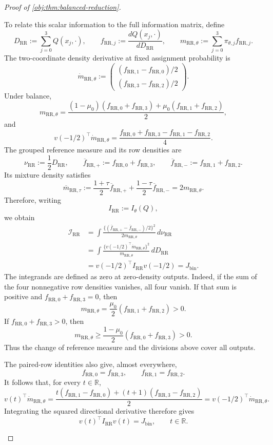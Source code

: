 \documentclass[11pt]{article}
\begin{document}
\begin{proof}[Proof of \cref{obj:thm:balanced-reduction}]
\begin{enumerate}
To relate this scalar information to the full information matrix, define
\[
D_{\mathrm{RR}}
:=\sum_{j=0}^3Q(x_j,\cdot),
\qquad
f_{\mathrm{RR},j}
:=\frac{dQ(x_j,\cdot)}{dD_{\mathrm{RR}}},
\qquad
m_{\mathrm{RR},\theta}
:=\sum_{j=0}^3\pi_{\theta,j}f_{\mathrm{RR},j}.
\]
The two-coordinate density derivative at fixed assignment probability is
\[
\dot m_{\mathrm{RR},\theta}
:=
\begin{pmatrix}
(f_{\mathrm{RR},1}-f_{\mathrm{RR},0})/2\\
(f_{\mathrm{RR},3}-f_{\mathrm{RR},2})/2
\end{pmatrix}.
\]
Under balance,
\[
m_{\mathrm{RR},\theta}
=
\frac{(1-\mu_0)(f_{\mathrm{RR},0}+f_{\mathrm{RR},3})
+\mu_0(f_{\mathrm{RR},1}+f_{\mathrm{RR},2})}{2},
\]
and
\[
v(-1/2)^\top\dot m_{\mathrm{RR},\theta}
=
\frac{f_{\mathrm{RR},0}+f_{\mathrm{RR},3}
-f_{\mathrm{RR},1}-f_{\mathrm{RR},2}}4.
\]
The grouped reference measure and its row densities are
\[
\nu_{\mathrm{RR}}:=\frac12D_{\mathrm{RR}},
\qquad
\overline f_{\mathrm{RR},+}
:=f_{\mathrm{RR},0}+f_{\mathrm{RR},3},
\qquad
\overline f_{\mathrm{RR},-}
:=f_{\mathrm{RR},1}+f_{\mathrm{RR},2}.
\]
Its mixture density satisfies
\[
\overline m_{\mathrm{RR},\tau}
:=\frac{1+\tau}{2}\overline f_{\mathrm{RR},+}
+\frac{1-\tau}{2}\overline f_{\mathrm{RR},-}
=2m_{\mathrm{RR},\theta}.
\]
Therefore, writing
\[
I_{\mathrm{RR}}:=I_\theta(Q),
\]
we obtain
\[
\begin{aligned}
\mathcal I_{\mathrm{RR}}
&=
\int
\frac{\{(\overline f_{\mathrm{RR},+}
-\overline f_{\mathrm{RR},-})/2\}^2}
{2m_{\mathrm{RR},\theta}}\,d\nu_{\mathrm{RR}}\\
&=
\int
\frac{\{v(-1/2)^\top\dot m_{\mathrm{RR},\theta}\}^2}
{m_{\mathrm{RR},\theta}}\,dD_{\mathrm{RR}}\\
&=v(-1/2)^\top I_{\mathrm{RR}}v(-1/2)
=J_{\mathrm{bin}}.
\end{aligned}
\]
The integrands are defined as zero at zero-density outputs. Indeed, if
the sum of the four nonnegative row densities vanishes, all four vanish.
If that sum is positive and
\(f_{\mathrm{RR},0}+f_{\mathrm{RR},3}=0\), then
\[
m_{\mathrm{RR},\theta}
=\frac{\mu_0}{2}
(f_{\mathrm{RR},1}+f_{\mathrm{RR},2})>0.
\]
If \(f_{\mathrm{RR},0}+f_{\mathrm{RR},3}>0\), then
\[
m_{\mathrm{RR},\theta}
\ge\frac{1-\mu_0}{2}
(f_{\mathrm{RR},0}+f_{\mathrm{RR},3})>0.
\]
Thus the change of reference measure and the divisions above cover all
outputs.

The paired-row identities also give, almost everywhere,
\[
f_{\mathrm{RR},0}=f_{\mathrm{RR},3},
\qquad
f_{\mathrm{RR},1}=f_{\mathrm{RR},2}.
\]
It follows that, for every \(t\in\mathbb R\),
\[
v(t)^\top\dot m_{\mathrm{RR},\theta}
=
\frac{t(f_{\mathrm{RR},1}-f_{\mathrm{RR},0})
+(t+1)(f_{\mathrm{RR},3}-f_{\mathrm{RR},2})}{2}
=
v(-1/2)^\top\dot m_{\mathrm{RR},\theta}.
\]
Integrating the squared directional derivative therefore gives
\[
v(t)^\top I_{\mathrm{RR}}v(t)=J_{\mathrm{bin}},
\qquad t\in\mathbb R.
\]


\end{enumerate}
\end{proof}
\end{document}

